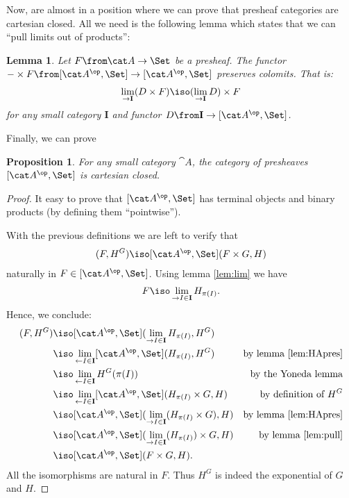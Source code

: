 \documentclass{article}
\newtheorem{lemma}{Lemma}
\newtheorem{proposition}{Proposition}
\begin{document}
Now, are almost in a position where we can prove that presheaf categories are cartesian closed. All we need is the following lemma which states that we can ``pull limits out of products'':
\begin{lemma}
  \label{lem:pull}
  Let $F\from \cat A\to\Set$ be a presheaf. The functor $-\times F\from [\cat A^\op,\Set]\to[\cat A^\op,\Set]$ preserves colomits. That is:
  \begin{align*}
    \lim_{\to \mathbf I} (D\times F)\iso (\lim_{\to \mathbf I} D)\times F
  \end{align*}
  for any small category $\mathbf I$ and functor $D\from\mathbf I\to [\cat A^\op,\Set]$.
\end{lemma}
Finally, we can prove
\begin{proposition}
  For any small category $\cat A$, the category of presheaves $[\cat A^\op,\Set]$ is cartesian closed.
\end{proposition}
\begin{proof}
  It easy to prove that $[\cat A^\op,\Set]$ has terminal objects and binary products (by defining them ``pointwise'').

  With the previous definitions we are left to verify that 
  \begin{align*}
    [\cat A^\op,\Set](F,H^G)\iso [\cat A^\op,\Set](F\times G,H)
  \end{align*}
  naturally in $F\in[\cat A^\op,\Set]$. Using lemma \ref{lem:lim} we have
  \begin{align*}
    F\iso\lim_{\to I\in\mathbf I} H_{\pi(I)}.
  \end{align*}
Hence, we conclude:
  \begin{align*}
    [\cat A^\op,\Set](F,H^G)&\iso [\cat A^\op,\Set](\lim_{\to I\in\mathbf I} H_{\pi(I)},H^G)&\\
                            &\iso \lim_{\leftarrow I\in\mathbf I} [\cat A^\op,\Set](H_{\pi(I)},H^G)&\text{by lemma \ref{lem:HApres}}\\
                            &\iso \lim_{\leftarrow I\in\mathbf I} H^G(\pi(I))&\text{by the Yoneda lemma}\\
                            &\iso \lim_{\leftarrow I\in\mathbf I} [\cat A^\op,\Set](H_{\pi(I)}\times G,H)&\text{by definition of } H^G\\
                            &\iso [\cat A^\op,\Set](\lim_{\to I\in\mathbf I}(H_{\pi(I)}\times G),H)&\text{by lemma \ref{lem:HApres}}\\
                            &\iso [\cat A^\op,\Set](\lim_{\to I\in\mathbf I}(H_{\pi(I)})\times G,H)&\text{by lemma \ref{lem:pull}}\\
                            &\iso[\cat A^\op,\Set](F\times G,H).
  \end{align*}
  All the isomorphisms are natural in $F$. Thus $H^G$ is indeed the exponential of $G$ and $H$.
\end{proof}
\end{document}

